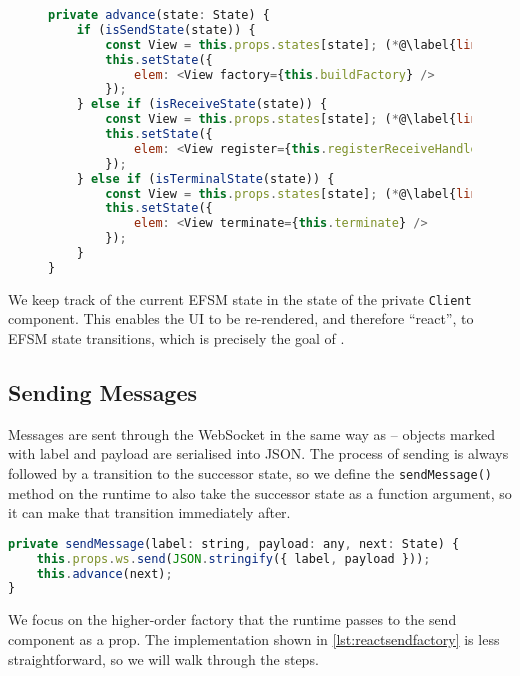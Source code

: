 \begin{figure}[!h]
\begin{lstlisting}[language=javascript]
private advance(state: State) {
	if (isSendState(state)) {
		const View = this.props.states[state]; (*@\label{line:reactadvance1}@*)
		this.setState({	
			elem: <View factory={this.buildFactory} />
		});
	} else if (isReceiveState(state)) {
		const View = this.props.states[state]; (*@\label{line:reactadvance2}@*)
		this.setState({
			elem: <View register={this.registerReceiveHandler} />
		});
	} else if (isTerminalState(state)) {
		const View = this.props.states[state]; (*@\label{line:reactadvance3}@*)
		this.setState({
			elem: <View terminate={this.terminate} />
		});
	}
}
\end{lstlisting}
\label{lst:reacttransitionfunc}
\end{figure}

We keep track of the current EFSM state in the state of the
private \texttt{Client} component.
This enables the UI to be re-rendered, and therefore ``react'',
to EFSM state transitions, which is precisely the goal of .

\subsection{Sending Messages}
\label{subsection:reactruntimesend}

Messages are sent through the WebSocket in the same way 
as  -- objects marked with label and payload
are serialised into JSON. The process of sending is always followed
by a transition to the successor state, so we define the
\texttt{sendMessage()} method on the runtime to also take
the successor state as a function argument, so it can make that transition
immediately after.

\begin{lstlisting}[language=javascript,numbers=none]
private sendMessage(label: string, payload: any, next: State) {
	this.props.ws.send(JSON.stringify({ label, payload }));
	this.advance(next);
}
\end{lstlisting}

We focus on the higher-order factory that the runtime passes
to the send component as a prop. The implementation shown in
\cref{lst:reactsendfactory} is less straightforward,
so we will walk through the steps.

